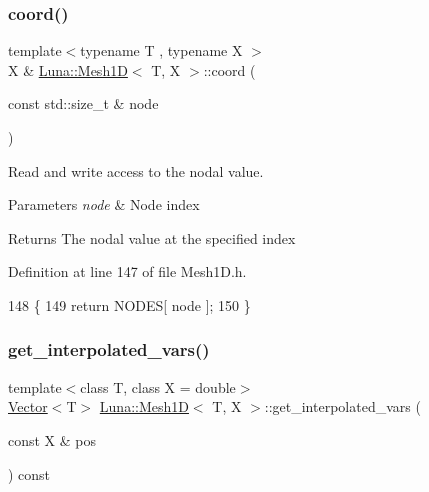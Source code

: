 \subsubsection{\texorpdfstring{coord()}{coord()}\hspace{0.1cm}{\footnotesize\ttfamily [2/2]}}
{\footnotesize\ttfamily template$<$typename T , typename X $>$ \\
X \& \hyperlink{classLuna_1_1Mesh1D}{Luna\+::\+Mesh1D}$<$ T, X $>$\+::coord (\begin{DoxyParamCaption}\item[{const std\+::size\+\_\+t \&}]{node }\end{DoxyParamCaption})\hspace{0.3cm}{\ttfamily [inline]}}



Read and write access to the nodal value. 


\begin{DoxyParams}{Parameters}
{\em node} & Node index \\
\hline
\end{DoxyParams}
\begin{DoxyReturn}{Returns}
The nodal value at the specified index 
\end{DoxyReturn}


Definition at line 147 of file Mesh1\+D.\+h.


\begin{DoxyCode}
148   \{
149     \textcolor{keywordflow}{return} NODES[ node ];
150   \}
\end{DoxyCode}
\mbox{\label{classLuna_1_1Mesh1D_af5e794667847fb278a028acc3ddea1d2}} 
\subsubsection{\texorpdfstring{get\+\_\+interpolated\+\_\+vars()}{get\_interpolated\_vars()}\hspace{0.1cm}{\footnotesize\ttfamily [1/4]}}
{\footnotesize\ttfamily template$<$class T, class X = double$>$ \\
\hyperlink{classLuna_1_1Vector}{Vector}$<$T$>$ \hyperlink{classLuna_1_1Mesh1D}{Luna\+::\+Mesh1D}$<$ T, X $>$\+::get\+\_\+interpolated\+\_\+vars (\begin{DoxyParamCaption}\item[{const X \&}]{pos }\end{DoxyParamCaption}) const}



